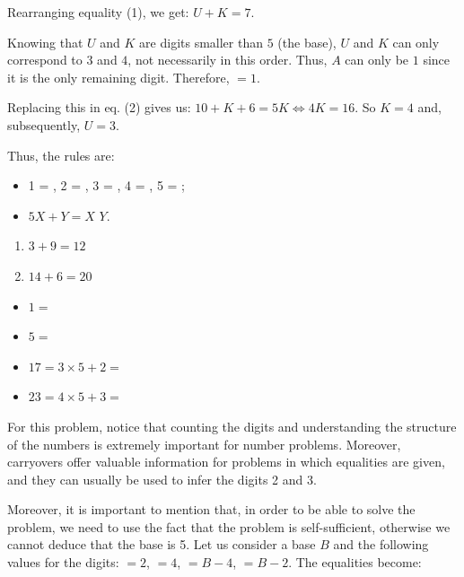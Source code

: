 \begin{refsection}
\begin{mysolution}
 Rearranging equality (1), we get: $U + K = 7$.

Knowing that $U$ and $K$ are digits smaller than $5$ (the base), $U$ and $K$ can only correspond to $3$ and $4$, not necessarily in this order. Thus, $A$ can only be $1$ since it is the only remaining digit. Therefore,  $= 1$.

Replacing this in eq. (2) gives us: $10 + K + 6 = 5K \Leftrightarrow 4K = 16$. So $K = 4$ and, subsequently, $U = 3$.

Thus, the rules are:
\begin{itemize}
    \item 1 = , 2 = , 3 = , 4 = , 5 = ;
    \item $5X + Y = X$  $Y$.
\end{itemize}

\begin{solutions}
    \item
    \begin{multicols}{2}
        \begin{enumerate}[label = (\arabic*)]
            \item $3+9=12$
            \item $14+6=20$
        \end{enumerate}
    \end{multicols}
    \item
    \begin{itemize}
        \item[] $1 =$ 
        \item[] $5 =$ 
        \item[] $17 = 3\times5+2 =$ 
        \item[] $23 = 4\times5+3 =$ 
    \end{itemize}
\end{solutions}
\end{mysolution}

\begin{discussion}
For this problem, notice that counting the digits and understanding the structure of the numbers is extremely important for number problems. Moreover, carryovers offer valuable information for problems in which equalities are given, and they can usually be used to infer the digits 2 and 3.

Moreover, it is important to mention that, in order to be able to solve the problem, we need to use the fact that the problem is self-sufficient, otherwise we cannot deduce that the base is 5. Let us consider a base $B$ and the following values for the digits:  $= 2$,  $= 4$,  $= B-4$,  $= B-2$. The equalities become:


\end{discussion}
\end{refsection}

